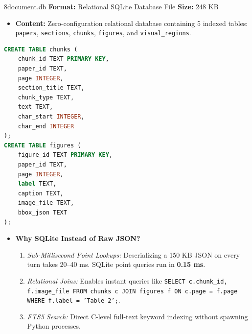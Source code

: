 \documentclass[11pt,a4paper]{article}
\begin{document}
\begin{artifactbox}{8}{document.db}
\textbf{Format:} Relational SQLite Database File \hfill \textbf{Size:} 248 KB
\begin{itemize}[noitemsep]
    \item \textbf{Content:} Zero-configuration relational database containing 5 indexed tables: \texttt{papers}, \texttt{sections}, \texttt{chunks}, \texttt{figures}, and \texttt{visual\_regions}.
\end{itemize}
\begin{lstlisting}[language=sql]
CREATE TABLE chunks (
    chunk_id TEXT PRIMARY KEY,
    paper_id TEXT,
    page INTEGER,
    section_title TEXT,
    chunk_type TEXT,
    text TEXT,
    char_start INTEGER,
    char_end INTEGER
);
CREATE TABLE figures (
    figure_id TEXT PRIMARY KEY,
    paper_id TEXT,
    page INTEGER,
    label TEXT,
    caption TEXT,
    image_file TEXT,
    bbox_json TEXT
);
\end{lstlisting}
\begin{itemize}[noitemsep]
    \item \textbf{Why SQLite Instead of Raw JSON?}
    \begin{enumerate}[noitemsep]
        \item \textit{Sub-Millisecond Point Lookups:} Deserializing a 150 KB JSON on every turn takes 20--40 ms. SQLite point queries run in \textbf{0.15 ms}.
        \item \textit{Relational Joins:} Enables instant queries like \texttt{SELECT c.chunk\_id, f.image\_file FROM chunks c JOIN figures f ON c.page = f.page WHERE f.label = 'Table 2';}.
        \item \textit{FTS5 Search:} Direct C-level full-text keyword indexing without spawning Python processes.
    \end{enumerate}
\end{itemize}
\end{artifactbox}
\end{document}
